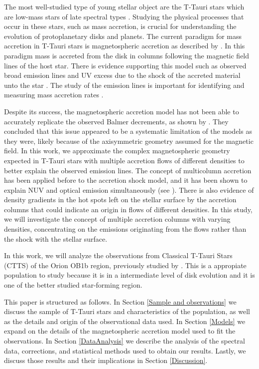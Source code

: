 \documentclass[twocolumn,linenumbers]{aastex631}
\begin{document}
The most well-studied type of young stellar object are the T-Tauri stars which  are low-mass stars of late spectral types \citep{hartmann2016}. Studying the physical processes that occur in these stars, such as mass accretion, is crucial for understanding the evolution of protoplanetary disks and planets. The current paradigm for mass accretion in T-Tauri stars is magnetospheric accretion as described by \citet{hartmann2016}. In this paradigm mass is accreted from the disk in columns following the magnetic field lines of the host star. There is evidence supporting this model such as observed broad emission lines \citep{muzerolle2001} and UV excess due to the shock of the accreted material unto the star \citep{calvet_gullbring1998}. The study of the emission lines is important for identifying and measuring mass accretion rates \citep{hartmann1994, muzerolle1998a, muzerolle1998b, muzerolle2001}.


Despite its success, the magnetospheric accretion model has not been able to accurately replicate the observed Balmer decrements, as shown by \citet{micolta2023}. They concluded that this issue appeared to be a systematic limitation of the models as they were, likely because of the axisymmetric geometry assumed for the magnetic field. In this work, we approximate the complex magnetospheric geometry expected in T-Tauri stars with multiple accretion flows of different densities to better explain the observed emission lines. The concept of multicolumn accretion has been applied before to the accretion shock model, and it has been shown to explain NUV and optical emission simultaneously (see \citet{ingleby2013, pittman2022}). There is also evidence of density gradients in the hot spots left on the stellar surface by the accretion columns \citep{espaillat2021} that could indicate an origin in flows of different densities. In this study, we will investigate the concept of multiple accretion columns with varying densities, concentrating on the emissions originating from the flows rather than the shock with the stellar surface.

In this work, we will analyze the observations from  Classical T-Tauri Stars (CTTS) of the Orion OB1b region, previously studied by \citet{manara2021}. This is a appropiate population to study because it is in a intermediate level of disk evolution and it is one of the better studied star-forming region.

This paper is structured as follows. In Section \ref{Sample and observations} we discuss the sample of T-Tauri stars and characteristics of the population, as well as the details and origin of the observational data used. In Section \ref{Models} we expand on the details of the magnetospheric accretion model used to fit the observations. In Section \ref{DataAnalysis} we describe the analysis of the spectral data, corrections, and statistical methods used to obtain our results. Lastly, we discuss those results and their implications in Section \ref{Discussion}.
\end{document}
